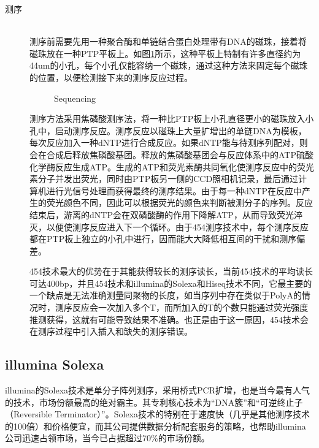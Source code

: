 \documentclass[12pt]{article} %
\begin{document}
\begin{description}
	\item[测序] \hfill \\ 
	测序前需要先用一种聚合酶和单链结合蛋白处理带有DNA的磁珠，接着将磁珠放在一种PTP平板上。如图\ref{fig:rochec}所示，这种平板上特制有许多直径约为44um的小孔，每个小孔仅能容纳一个磁珠，通过这种方法来固定每个磁珠的位置，以便检测接下来的测序反应过程。　　
	
		\begin{figure}[H] %
		\caption{Sequencing}
		\label{fig:rochec}
	\end{figure}
	
	
	测序方法采用焦磷酸测序法\cite{Paper:Mardis, Paper:Shendure, Paper:Mardi}，将一种比PTP板上小孔直径更小的磁珠放入小孔中，启动测序反应。测序反应以磁珠上大量扩增出的单链DNA为模板，每次反应加入一种dNTP进行合成反应。如果dNTP能与待测序列配对，则会在合成后释放焦磷酸基团。释放的焦磷酸基团会与反应体系中的ATP硫酸化学酶反应生成ATP。生成的ATP和荧光素酶共同氧化使测序反应中的荧光素分子并发出荧光，同时由PTP板另一侧的CCD照相机记录，最后通过计算机进行光信号处理而获得最终的测序结果。由于每一种dNTP在反应中产生的荧光颜色不同，因此可以根据荧光的颜色来判断被测分子的序列。反应结束后，游离的dNTP会在双磷酸酶的作用下降解ATP，从而导致荧光淬灭，以便使测序反应进入下一个循环。由于454测序技术中，每个测序反应都在PTP板上独立的小孔中进行，因而能大大降低相互间的干扰和测序偏差。
	
	
	454技术最大的优势在于其能获得较长的测序读长，当前454技术的平均读长可达400bp，并且454技术和illumina的Solexa和Hiseq技术不同，它最主要的一个缺点是无法准确测量同聚物的长度，如当序列中存在类似于PolyA的情况时，测序反应会一次加入多个T，而所加入的T的个数只能通过荧光强度推测获得，这就有可能导致结果不准确。也正是由于这一原因，454技术会在测序过程中引入插入和缺失的测序错误。 




\end{description}




\subsection{illumina Solexa}
illumina的Solexa技术是单分子阵列测序，采用桥式PCR扩增，也是当今最有人气的技术，市场份额最高的绝对霸主。其专利核心技术为“DNA簇”和“可逆终止子（Reversible Terminator）”。Solexa\cite{Paper:Mardis,  Paper:Mardi}技术的特别在于速度快（几乎是其他测序技术的100倍）和价格便宜，而其公司提供数据分析配套服务的策略，也帮助illumina公司迅速占领市场，当今已占据超过70\%的市场份额。
\end{document}
